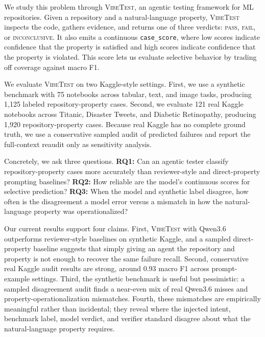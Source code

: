 \documentclass[11pt]{article}
\newcommand{\pass}{\textsc{pass}}
\newcommand{\fail}{\textsc{fail}}
\newcommand{\inconclusive}{\textsc{inconclusive}}
\newcommand{\vibetest}{\textsc{VibeTest}}
\newcommand{\qwen}{Qwen3.6}
\begin{document}
We study this problem through \vibetest, an agentic testing framework for ML repositories.
Given a repository and a natural-language property, \vibetest{} inspects the code, gathers evidence, and returns one of three verdicts: \pass, \fail, or \inconclusive.
It also emits a continuous \texttt{case\_score}, where low scores indicate confidence that the property is satisfied and high scores indicate confidence that the property is violated.
This score lets us evaluate selective behavior by trading off coverage against macro F1.

We evaluate \vibetest{} on two Kaggle-style settings.
First, we use a synthetic benchmark with 75 notebooks across tabular, text, and image tasks, producing 1,125 labeled repository-property cases.
Second, we evaluate 121 real Kaggle notebooks across Titanic, Disaster Tweets, and Diabetic Retinopathy, producing 1,920 repository-property cases.
Because real Kaggle has no complete ground truth, we use a conservative sampled audit of predicted failures and report the full-context reaudit only as sensitivity analysis.

Concretely, we ask three questions.
\textbf{RQ1:} Can an agentic tester classify repository-property cases more accurately than reviewer-style and direct-property prompting baselines?
\textbf{RQ2:} How reliable are the model's continuous scores for selective prediction?
\textbf{RQ3:} When the model and synthetic label disagree, how often is the disagreement a model error versus a mismatch in how the natural-language property was operationalized?

Our current results support four claims.
First, \vibetest{} with \qwen{} outperforms reviewer-style baselines on synthetic Kaggle, and a sampled direct-property baseline suggests that simply giving an agent the repository and property is not enough to recover the same failure recall.
Second, conservative real Kaggle audit results are strong, around 0.93 macro F1 across prompt-example settings.
Third, the synthetic benchmark is useful but pessimistic: a sampled disagreement audit finds a near-even mix of real \qwen{} misses and property-operationalization mismatches.
Fourth, these mismatches are empirically meaningful rather than incidental; they reveal where the injected intent, benchmark label, model verdict, and verifier standard disagree about what the natural-language property requires.
\end{document}

